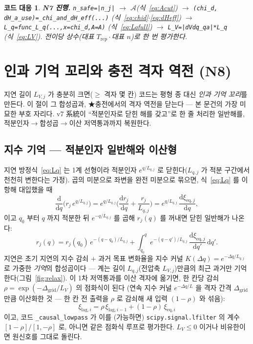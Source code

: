 \documentclass[11pt,a4paper]{article}
\newtheorem*{codebox}{코드 대응}
\newcommand{\dd}{\mathrm{d}}
\newcommand{\eq}{\mathrm{eq}}
\newcommand{\rep}{\mathrm{rep}}
\newcommand{\code}[1]{\texttt{#1}}
\begin{document}
\begin{codebox}
\textbf{N7 진행.} \code{n\_safe=|n\_j|} $\to$ $\mathcal A$(식~\eqref{eq:Acut}) $\to$
\code{(chi\_d, dH\_a\_use)=\_chi\_and\_dH\_eff(...)} (식~\eqref{eq:chid}$\cdot$\eqref{eq:dHeff}) $\to$
\code{L\_q=func\_L\_q(...,x=chi\_d,A=A)} (식~\eqref{eq:Lqfull}) $\to$ \code{L\_V=|dVdq\_qa|*L\_q} (식~\eqref{eq:LV}).
전이당 \emph{상수}(대표 $T_\rep\cdot$대표 $n$)로 한 번 평가한다.
\end{codebox}

\section{인과 기억 꼬리와 충전 격자 역전 (N8)}\label{sec:tail}
지연 길이 $L_{V,j}$ 가 충분히 크면($\ge$ 격자 몇 칸) 코드는 평형 종 대신 \emph{인과 기억 꼬리}를 만든다. 이 절이 그
합성곱과, ★충전에서의 격자 역전을 닫는다 — 본 문건의 가장 미묘한 부호 자리다. v7 系統이 ``적분인자로 닫힌 해를
갖고''로 한 줄 처리한 일반해를, 적분인자$\to$합성곱$\to$이산 저역통과까지 복원한다.

\subsection{지수 기억 — 적분인자 일반해와 이산형}
지연 방정식~\eqref{eq:Lq} 는 1계 선형이라 적분인자 $e^{q/L_{q,j}}$ 로 닫힌다($L_{q,j}$ 가 적분 구간에서 천천히 변한다는
가정). 곱의 미분으로 좌변을 완전 미분으로 묶으면, 식~\eqref{eq:Lq} 를 이항해 대입했을 때
\begin{equation}
\frac{\dd}{\dd q}\Big(r_j\,e^{q/L_{q,j}}\Big)
=e^{q/L_{q,j}}\Big(\frac{\dd r_j}{\dd q}+\frac{r_j}{L_{q,j}}\Big)
=e^{q/L_{q,j}}\,\frac{\dd\xi_{\eq,j}}{\dd q},
\label{eq:intfactor}
\end{equation}
이고 $q_0$ 부터 $q$ 까지 적분한 뒤 $e^{-q/L_{q,j}}$ 를 곱해 $r_j(q)$ 를 꺼내면 닫힌 일반해가 나온다:
\begin{equation}
r_j(q)=r_j(q_0)\,e^{-(q-q_0)/L_{q,j}}
+\int_{q_0}^{q}e^{-(q-q')/L_{q,j}}\,\frac{\dd\xi_{\eq,j}}{\dd q'}\,\dd q'.
\label{eq:memory}
\end{equation}
지연은 초기 지연의 지수 감쇠 $+$ 과거 목표 변화율을 지수 커널 $K(\Delta q)=e^{-\Delta q/L_{q,j}}$ 로 가중한
\emph{기억}의 합성곱이다 — 계는 길이 $L_{q,j}$(전압축 $L_{V,j}$)만큼의 최근 과거만 기억한다(그림~\ref{fig:relax}).
이 1차 저역통과를 이산 격자에 옮기면, 한 칸당 감쇠 $\rho=\exp(-\Delta_\mathrm{grid}/L_V)$ 의 점화식이 된다
(연속 지수 커널 $e^{-\Delta q/L}$ 을 격자 간격 $\Delta_\mathrm{grid}$ 만큼 이산화한 것 — 한 칸 전 출력을 $\rho$ 로
감쇠해 새 입력 $(1-\rho)$ 와 섞음):
\begin{equation}
\xi_{\mathrm{lag},i}=\rho\,\xi_{\mathrm{lag},i-1}+(1-\rho)\,\xi_{\eq,i}
\label{eq:lowpass}
\end{equation}
이고, 코드 \code{\_causal\_lowpass} 가 이를 (가능하면) \code{scipy.signal.lfilter} 의 계수 $[1-\rho]/[1,-\rho]$ 로,
아니면 같은 점화식 루프로 평가한다. $L_V\le0$ 이거나 비유한이면 원신호를 그대로 돌린다.
\end{document}

